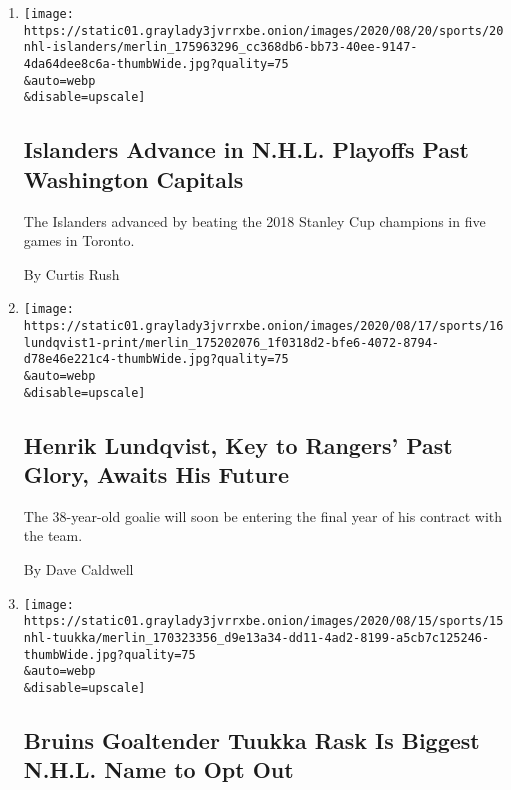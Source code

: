 \begin{enumerate}
\def\labelenumi{\arabic{enumi}.}
\item
  \href{/2020/08/20/sports/hockey/islanders-capitals-nhl-playoffs.html}{}

  \texttt{[image: https://static01.graylady3jvrrxbe.onion/images/2020/08/20/sports/20nhl-islanders/merlin\_175963296\_cc368db6-bb73-40ee-9147-4da64dee8c6a-thumbWide.jpg?quality=75\\\&auto=webp\\\&disable=upscale]}

  \hypertarget{islanders-advance-in-nhl-playoffs-past-washington-capitals}{%
  \subsection{Islanders Advance in N.H.L. Playoffs Past Washington
  Capitals}\label{islanders-advance-in-nhl-playoffs-past-washington-capitals}}

  The Islanders advanced by beating the 2018 Stanley Cup champions in
  five games in Toronto.

  By Curtis Rush
\item
  \href{/2020/08/16/sports/hockey/henrik-lundqvist-rangers-contract.html}{}

  \texttt{[image: https://static01.graylady3jvrrxbe.onion/images/2020/08/17/sports/16lundqvist1-print/merlin\_175202076\_1f0318d2-bfe6-4072-8794-d78e46e221c4-thumbWide.jpg?quality=75\\\&auto=webp\\\&disable=upscale]}

  \hypertarget{henrik-lundqvist-key-to-rangers-past-glory-awaits-his-future}{%
  \subsection{Henrik Lundqvist, Key to Rangers' Past Glory, Awaits His
  Future}\label{henrik-lundqvist-key-to-rangers-past-glory-awaits-his-future}}

  The 38-year-old goalie will soon be entering the final year of his
  contract with the team.

  By Dave Caldwell
\item
  \href{/2020/08/15/sports/hockey/boston-bruins-goalie-tuukka-rask.html}{}

  \texttt{[image: https://static01.graylady3jvrrxbe.onion/images/2020/08/15/sports/15nhl-tuukka/merlin\_170323356\_d9e13a34-dd11-4ad2-8199-a5cb7c125246-thumbWide.jpg?quality=75\\\&auto=webp\\\&disable=upscale]}

  \hypertarget{bruins-goaltender-tuukka-rask-is-biggest-nhl-name-to-opt-out}{%
  \subsection{Bruins Goaltender Tuukka Rask Is Biggest N.H.L. Name to
  Opt
  Out}\label{bruins-goaltender-tuukka-rask-is-biggest-nhl-name-to-opt-out}}


\end{enumerate}
